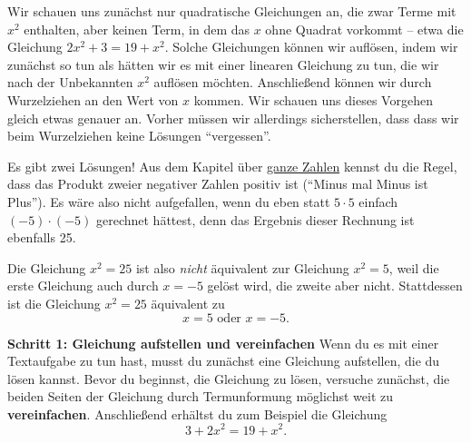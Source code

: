 \documentclass[../../main.tex]{subfiles}
\begin{document}
Wir schauen uns zunächst nur quadratische Gleichungen an, die zwar Terme mit $x^2$ 
enthalten, aber keinen Term, in dem das $x$ ohne Quadrat vorkommt -- etwa die Gleichung $2x^2+3=19+x^2$.
Solche Gleichungen können wir auflösen, indem wir zunächst so tun als hätten wir es mit einer linearen
Gleichung zu tun, die wir nach der Unbekannten $x^2$ auflösen möchten. Anschließend können wir durch Wurzelziehen an den
Wert von $x$ kommen. Wir schauen uns dieses Vorgehen gleich etwas genauer an. Vorher müssen wir allerdings sicherstellen,
dass dass wir beim Wurzelziehen keine Lösungen \enquote{vergessen}.

\begin{example}{Es gibt zwei Lösungen!}
    Aus dem Kapitel über \hyperlink{ch:ganze-zahlen}{ganze Zahlen} kennst du die Regel, dass das Produkt zweier
    negativer Zahlen positiv ist (\enquote{Minus mal Minus ist Plus}). Es wäre also nicht aufgefallen, wenn du eben 
    statt $5\cdot 5$ einfach $(-5)\cdot (-5)$ gerechnet hättest, denn das Ergebnis dieser Rechnung ist ebenfalls 25.

    Die Gleichung $x^2=25$ ist also \emph{nicht} äquivalent zur Gleichung $x^2=5$, weil die erste Gleichung auch durch
    $x=-5$ gelöst wird, die zweite aber nicht. Stattdessen ist die Gleichung $x^2=25$ äquivalent zu
    \[x=5\text{ oder }x=-5.\]
\end{example}

\textbf{Schritt 1: Gleichung aufstellen und vereinfachen}
Wenn du es mit einer Textaufgabe zu tun hast, musst du zunächst eine Gleichung aufstellen, die du lösen kannst. Bevor du
beginnst, die Gleichung zu lösen, versuche zunächst, die beiden Seiten der Gleichung durch Termunformung möglichst weit
zu \textbf{vereinfachen}. Anschließend erhältst du zum Beispiel die Gleichung
\[3+2x^2=19+x^2.\]
\end{document}
